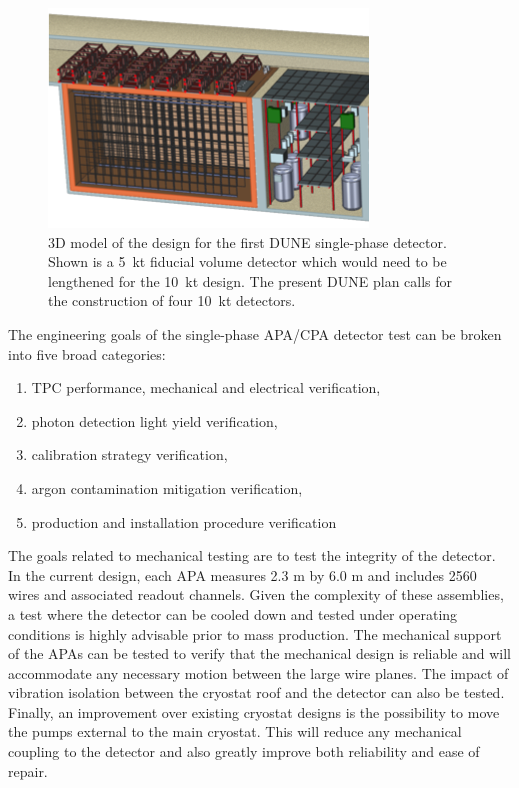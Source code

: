 \begin{figure}[!htb]
\centering
\begin{minipage}[b]{1.0\textwidth}
\begin{center}
\includegraphics[width=.75\textwidth]{figures/fardet-3D.png}
\end{center}
\end{minipage}
\caption{\small 3D model of the design for the first DUNE single-phase detector. Shown is a 5~kt fiducial volume detector which would need to be lengthened for the 10~kt design. The present DUNE plan calls for the construction of four 10~kt detectors. }
\label{fig:fardet-overview} 
\end{figure}

The engineering goals of the single-phase APA/CPA detector test can be broken into five broad categories: 
\begin{enumerate}
	\item TPC performance, mechanical and electrical verification, 
	\item photon detection light yield verification,
	\item calibration strategy verification,
	\item argon contamination mitigation verification, 
	\item production and installation procedure verification
\end{enumerate}

	 The goals related to mechanical testing are to test the integrity of the detector. In the current design, each APA measures 2.3 m by 6.0 m and includes 2560 wires and associated readout channels. Given the complexity of these assemblies, a test where the detector can be cooled down and tested under operating conditions is highly advisable prior to mass production. The mechanical support of the APAs can be tested to verify that the mechanical design is reliable and will accommodate any necessary motion between the large wire planes. The impact of vibration isolation between the cryostat roof and the detector can also be tested. Finally, an improvement over existing cryostat designs is the possibility to move the pumps external to the main cryostat. This will reduce any mechanical coupling to the detector and also greatly improve both reliability and ease of repair.

